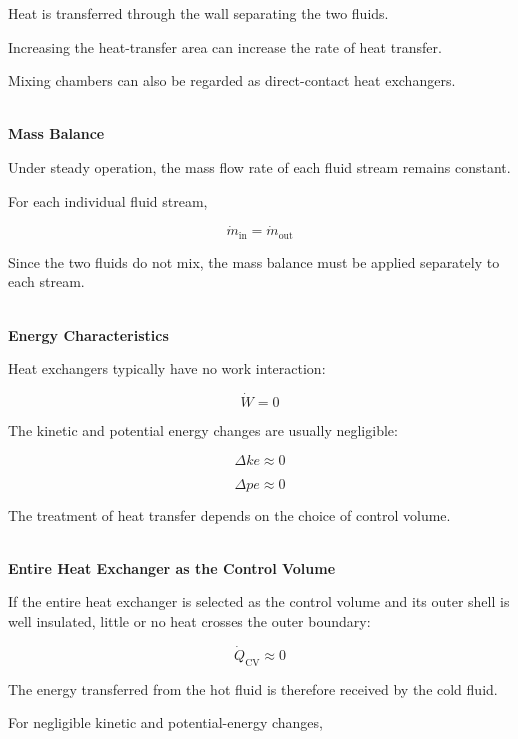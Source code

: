 \documentclass[12pt]{article}
\begin{document}
Heat is transferred through the wall separating the two fluids.

Increasing the heat-transfer area can increase the rate of heat transfer.

Mixing chambers can also be regarded as direct-contact heat exchangers.

\textbf{\\ Mass Balance}

Under steady operation, the mass flow rate of each fluid stream remains constant.

For each individual fluid stream,

\begin{equation*}
\dot{m}_{\mathrm{in}}
=
\dot{m}_{\mathrm{out}}
\end{equation*}

Since the two fluids do not mix, the mass balance must be applied separately to each stream.

\textbf{\\ Energy Characteristics}

Heat exchangers typically have no work interaction:

\begin{equation*}
\dot{W}=0
\end{equation*}

The kinetic and potential energy changes are usually negligible:

\begin{equation*}
\Delta ke\approx0
\end{equation*}

\begin{equation*}
\Delta pe\approx0
\end{equation*}
    
The treatment of heat transfer depends on the choice of control volume.

\textbf{\\ Entire Heat Exchanger as the Control Volume}

If the entire heat exchanger is selected as the control volume and its outer shell is well insulated, little or no heat crosses the outer boundary:

\begin{equation*}
\dot{Q}_{\mathrm{CV}}\approx0
\end{equation*}

The energy transferred from the hot fluid is therefore received by the cold fluid.

For negligible kinetic and potential-energy changes,
\end{document}
